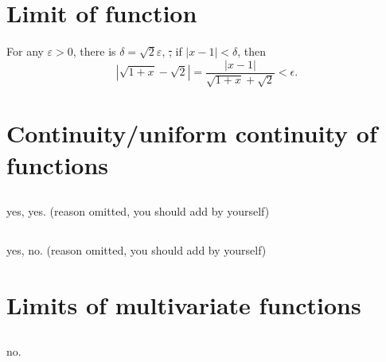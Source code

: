 \section{}
\section{}
\section{}
\section{}
\section{}
\section{Limit of function} %

For any \(\varepsilon>0\), there is \(\delta=\sqrt{2}\varepsilon \), \st, if \(|x-1|<\delta \), then
\[|\sqrt{1+x}-\sqrt{2}| = \frac{|x-1|}{\sqrt{1+x}+\sqrt{2}} < \epsilon. \]

\section{Continuity/uniform continuity of functions} %

\subsection{}
yes, yes. (reason omitted, you should add by yourself)

\subsection{}
yes, no. (reason omitted, you should add by yourself)

\section{Limits of multivariate functions} %

\subsection{}

no.

